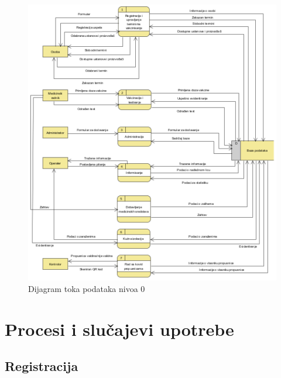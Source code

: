 \documentclass[titlepage]{article}
\begin{document}
\begin{figure}[H]
\centering
\includegraphics[scale=0.6]{DTP_dijagram}
\caption{Dijagram toka podataka nivoa 0}
\label{slk:dtp}
\end{figure}


\section{Procesi i slučajevi upotrebe}


\subsection{Registracija}
\end{document}
